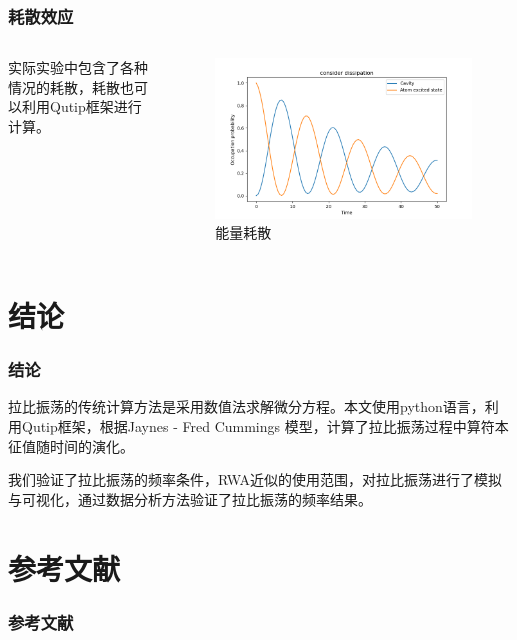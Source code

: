 \documentclass[aspectratio=169, 12pt]{beamer}
\begin{document}
\begin{frame}
    \frametitle{耗散效应}
    \begin{columns}
    实际实验中包含了各种情况的耗散，耗散也可以利用Qutip框架进行计算。
    \begin{figure}
        \centering
        \includegraphics[width=0.8\linewidth]{6.png}
        \caption{能量耗散}
        \label{fig:6}
    \end{figure}
    \end{columns}
\end{frame}

\section{结论}
\begin{frame}
    \frametitle{结论}
    拉比振荡的传统计算方法是采用数值法求解微分方程。本文使用python语言，利用Qutip框架，根据Jaynes - Fred Cummings 模型，计算了拉比振荡过程中算符本征值随时间的演化。

    我们验证了拉比振荡的频率条件，RWA近似的使用范围，对拉比振荡进行了模拟与可视化，通过数据分析方法验证了拉比振荡的频率结果。
\end{frame}

\section{参考文献}
\begin{frame}[allowframebreaks]
    \frametitle{参考文献}
    \printbibliography[heading=none]
\end{frame}
\end{document}

